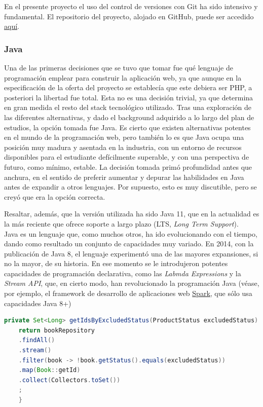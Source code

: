 \documentclass[a4paper]{article}
\begin{document}
    En el presente proyecto el uso del control de versiones con Git ha sido intensivo y fundamental. El repositorio del proyecto, alojado en GitHub, puede ser accedido \href{https://github.com/misrraimsp/firstmarket}{aquí}.
    
    \subsubsection{Java}
    Una de las primeras decisiones que se tuvo que tomar fue qué lenguaje de programación emplear para construir la aplicación web, ya que aunque en la especificación de la oferta del proyecto se establecía que este debiera ser PHP, a posteriori la libertad fue total. Esta no es una decisión trivial, ya que determina en gran medida el resto del stack tecnológico utilizado. Tras una exploración de las diferentes alternativas, y dado el background adquirido a lo largo del plan de estudios, la opción tomada fue Java. Es cierto que existen alternativas potentes en el mundo de la programación web, pero también lo es que Java ocupa una posición muy madura y asentada en la industria, con un entorno de recursos disponibles para el estudiante defícilmente superable, y con una perspectiva de futuro, como mínimo, estable. La decisión tomada primó profundidad antes que anchura, en el sentido de preferir aumentar y depurar las habilidades en Java antes de expandir a otros lenguajes. Por supuesto, esto es muy discutible, pero se creyó que era la opción correcta.
    
    Resaltar, además, que la versión utilizada ha sido Java 11, que en la actualidad es la más reciente que ofrece soporte a largo plazo (LTS, \emph{Long Term Support}).
    \\
    
    Java es un lenguaje que, como muchos otros, ha ido evolucionando con el tiempo, dando como resultado un conjunto de capacidades muy variado. En 2014, con la publicación de Java 8, el lenguaje experimentó una de las mayores expansiones, si no la mayor, de su historia. En ese momento se le introdujeron potentes capacidades de programación declarativa, como las \emph{Labmda Expressions} y la \emph{Stream API}, que, en cierto modo, han revolucionado la programación Java (véase, por ejemplo, el framework de desarrollo de aplicaciones web \href{http://sparkjava.com/}{Spark}, que sólo usa capacidades Java 8+)
    \\
    
    \begin{lstlisting}[language=Java,caption=Programación declarativa con Java,label=list:java_declarative]
    private Set<Long> getIdsByExcludedStatus(ProductStatus excludedStatus) {
    return bookRepository
    .findAll()
    .stream()
    .filter(book -> !book.getStatus().equals(excludedStatus))
    .map(Book::getId)
    .collect(Collectors.toSet())
    ;
    }
    \end{lstlisting}
    
\end{document}
